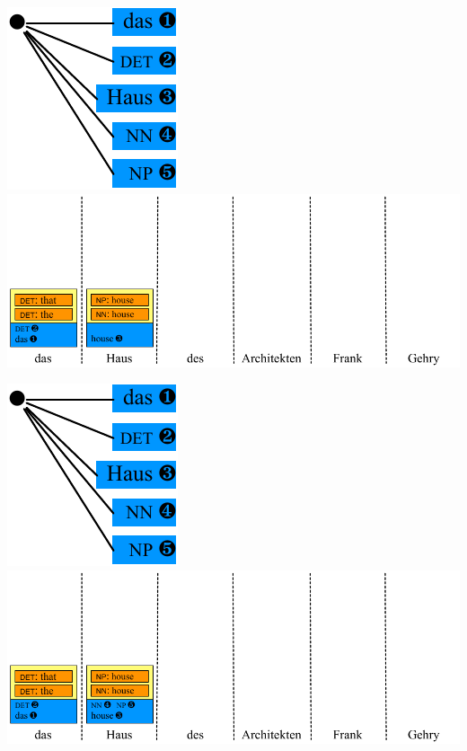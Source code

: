\documentclass[landscape]{slides}
\begin{document}

\begin{center}\vspace{7mm}
\includegraphics[scale=1.4]{accessing-grammar-rules-prefix-early5.pdf}\\[-1mm]
\includegraphics[scale=1.4]{accessing-grammar-rules-early-example6.pdf}
\end{center}


\begin{center}\vspace{7mm}
\includegraphics[scale=1.4]{accessing-grammar-rules-prefix-early5.pdf}\\[-1mm]
\includegraphics[scale=1.4]{accessing-grammar-rules-early-example7.pdf}
\end{center}
\end{document}
